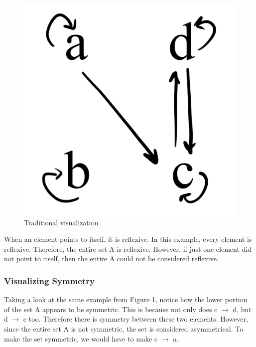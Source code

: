 \documentclass{article}
\begin{document}
{\begin{figure}[h!]
  \centering
  \includegraphics[scale=0.06]{v1}
  \caption[] {
     Traditional visualization
    \endtabular}
\end{figure}

\medskip\noindent
When an element points to itself, it is reflexive. In this example, every element is reflexive. Therefore, the entire set A is reflexive. However, if just one element did not point to itself, then the entire A could not be considered reflexive.

\subsubsection{Visualizing Symmetry}

\medskip\noindent
Taking a look at the same example from Figure 1, notice how the lower portion of the set A appears to be symmetric. This is because not only does c $\rightarrow$ d, but d $\rightarrow$ c too. Therefore there is symmetry between these two elements. However, since the entire set A is not symmetric, the set is considered asymmetrical. To make the set symmetric, we would have to make c $\rightarrow$ a.

}
\end{document}
